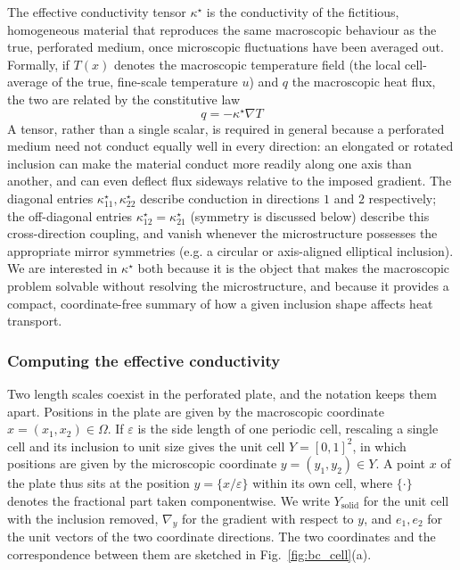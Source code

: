 \documentclass{article}
\makeatletter
\providecommand\FloatBarrier{\par\begingroup\let\@elt\relax
  \edef\@tempa{\@botlist\@deferlist\@dbldeferlist}%
  \ifx\@tempa\@empty\else\clearpage\fi\endgroup}
\newcommand{\tmop}[1]{\ensuremath{\operatorname{#1}}}
\makeatother
\begin{document}
The effective conductivity tensor $\kappa^{\star}$ is the conductivity of the
fictitious, homogeneous material that reproduces the same macroscopic
behaviour as the true, perforated medium, once microscopic fluctuations have
been averaged out. Formally, if $T (x)$ denotes the macroscopic
temperature field (the local cell-average of the true, fine-scale temperature
$u$) and $q$ the macroscopic heat flux, the two are related by the
constitutive law
\begin{equation}
  \label{eq:constitutive}
  q = - \kappa^{\star} \nabla T
\end{equation}
A tensor, rather than a single scalar, is required in general because a
perforated medium need not conduct equally well in every direction: an
elongated or rotated inclusion can make the material conduct more readily
along one axis than another, and can even deflect flux sideways relative to
the imposed gradient. The diagonal entries $\kappa^{\star}_{11},
\kappa^{\star}_{22}$ describe conduction in directions $1$ and $2$ respectively; the
off-diagonal entries $\kappa^{\star}_{12} = \kappa^{\star}_{21}$ (symmetry is
discussed below) describe this cross-direction coupling, and vanish whenever
the microstructure possesses the appropriate mirror symmetries (e.g. a
circular or axis-aligned elliptical inclusion). We are interested in
$\kappa^{\star}$ both because it is the object that makes the
macroscopic problem solvable without resolving the microstructure, and
because it provides a compact, coordinate-free summary of how a given
inclusion shape affects heat transport.

\FloatBarrier
\subsubsection{Computing the effective conductivity}
\label{sec:cell_problem}

Two length scales coexist in the perforated plate, and the notation keeps them
apart. Positions in the plate are given by the macroscopic coordinate
$x = (x_1, x_2) \in \Omega$. If $\varepsilon$ is the side length of one periodic
cell, rescaling a single cell and its inclusion to unit size gives the unit
cell $Y = [0, 1]^2$, in which positions are given by the microscopic coordinate
$y = (y_1, y_2) \in Y$. A point $x$ of the plate thus sits at the position
$y = \{ x / \varepsilon \}$ within its own cell, where $\{ \cdot \}$ denotes the
fractional part taken componentwise. We write $Y_{\tmop{solid}}$ for the unit
cell with the inclusion removed, $\nabla_y$ for the gradient with respect to
$y$, and $e_1, e_2$ for the unit vectors of the two coordinate directions. The two coordinates
and the correspondence between them are sketched in Fig.~\ref{fig:bc_cell}(a).
\end{document}
